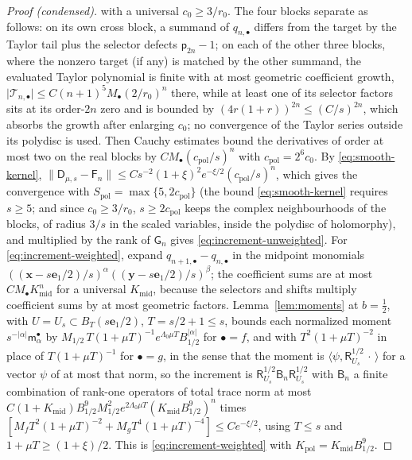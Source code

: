 \documentclass[aps,prl,reprint,longbibliography,raggedbottom]{revtex4-2}
\newcommand{\norm}[1]{\lVert #1\rVert}
\newcommand{\abs}[1]{\lvert #1\rvert}
\newcommand{\ip}[2]{\langle #1,#2\rangle}
\newcommand{\Res}{\mathsf R}
\newcommand{\JointRes}{\Res_{U_s}}
\newcommand{\JointD}{\mathsf D}
\newcommand{\bx}{\mathbf x}
\newcommand{\by}{\mathbf y}
\newcommand{\eone}{\mathbf e_1}
\begin{document}
\begin{proof}[Proof (condensed)]
with a universal $c_0\ge3/r_0$. The four blocks separate as
follows: on its own cross block, a summand of $q_{n,\bullet}$ differs
from the target by the Taylor tail plus the selector defects
$\mathsf p_{2n}-1$; on each of the other three blocks, where the
nonzero target (if any) is matched by the other summand, the evaluated
Taylor polynomial is finite with at most geometric coefficient growth,
$\abs{\mathcal T_{n,\bullet}}\le C(n+1)^5M_\bullet(2/r_0)^n$ there,
while at least one of its selector factors sits at its order-$2n$ zero
and is bounded by $(4r(1+r))^{2n}\le(C/s)^{2n}$, which absorbs the
growth after enlarging $c_0$; no convergence of the Taylor series
outside its polydisc is used.
Then Cauchy estimates bound the derivatives of order at most two on the
real blocks by $CM_\bullet(c_{\mathrm{pol}}/s)^n$ with
$c_{\mathrm{pol}}=2^6c_0$. By \eqref{eq:smooth-kernel},
$\norm{\JointD_{\mu,s}-\mathsf F_n}\le Cs^{-2}(1+\xi)^2e^{-\xi/2}(c_{\mathrm{pol}}/s)^n$,
which gives the convergence with
$S_{\mathrm{pol}}=\max\{5,2c_{\mathrm{pol}}\}$ (the bound
\eqref{eq:smooth-kernel} requires $s\ge5$; and since $c_0\ge3/r_0$,
$s\ge2c_{\mathrm{pol}}$ keeps the complex neighbourhoods of the
blocks, of radius $3/s$ in the scaled variables, inside the polydisc
of holomorphy), and
multiplied by the rank of $\mathsf G_n$ gives
\eqref{eq:increment-unweighted}. For \eqref{eq:increment-weighted},
expand $q_{n+1,\bullet}-q_{n,\bullet}$ in the midpoint monomials
$(({\bx-s\eone/2})/s)^\alpha(({\by-s\eone/2})/s)^\beta$; the coefficient sums
are at most $CM_\bullet K_{\mathrm{mid}}^n$ for a universal
$K_{\mathrm{mid}}$, because the selectors and shifts multiply
coefficient sums by at most geometric factors. Lemma~\ref{lem:moments}
at $b=\frac12$, with $U=U_s\subset B_T(s\eone/2)$, $T=s/2+1\le s$,
bounds each normalized moment
$s^{-\abs\alpha}\mathsf m^\bullet_\alpha$ by
$M_{1/2}\,T(1+\mu T)^{-1}e^{\Lambda_0\mu T}B_{1/2}^{\abs\alpha}$ for
$\bullet=f$, and with $T^2(1+\mu T)^{-2}$ in place of
$T(1+\mu T)^{-1}$ for $\bullet=g$, in the sense that the moment is
$\ip{\psi}{\JointRes^{1/2}\,\cdot\,}$ for a vector $\psi$ of at most
that norm, so the increment is
$\JointRes^{1/2}\mathsf B_n\JointRes^{1/2}$ with $\mathsf B_n$ a finite combination of
rank-one operators of total trace norm at most
$C(1+K_{\mathrm{mid}})B_{1/2}^9M_{1/2}^2e^{2\Lambda_0\mu T}(K_{\mathrm{mid}}B_{1/2}^9)^n$
times $[M_fT^2(1+\mu T)^{-2}+M_gT^4(1+\mu T)^{-4}]\le Ce^{-\xi/2}$,
using $T\le s$ and $1+\mu T\ge(1+\xi)/2$. This is
\eqref{eq:increment-weighted} with $K_{\mathrm{pol}}=K_{\mathrm{mid}}B_{1/2}^9$.
\end{proof}
\end{document}
